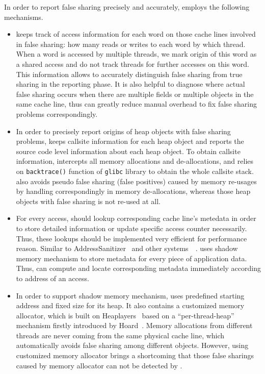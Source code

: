 In order to report false sharing precisely and accurately,  
\Predator{} employs the following mechanisms. 
\begin{itemize}
\item
\Predator{} keeps track of access information for each word on those
cache lines involved in false sharing: 
how many reads or writes to each word by which thread. 
When a word is accessed by multiple threads,
we mark origin of this word as a shared access and do not track threads for further accesses 
on this word. This information 
allows \Predator{} to accurately distinguish false sharing from true sharing 
in the reporting phase.
It is also helpful to diagnose where 
actual false sharing occurs when there are multiple fields or multiple objects 
in the same cache line, thus can greatly reduce manual overhead to fix false sharing problems
correspondingly. 

\item
In order to precisely report origins of heap objects with false sharing problems, \Predator{}
keeps callsite information for each heap object and reports the source code level
information about each heap object. To obtain callsite information, \Predator{}
intercepts all memory allocations and de-allocations, and relies on \texttt{backtrace()} 
function of \texttt{glibc} library to obtain the whole callsite stack. 
\Predator{} also avoids pseudo false sharing (false positives) caused by memory re-usages 
by handling correspondingly in memory de-allocations, whereas those heap objects with false 
sharing is not re-used at all.

\item
For every access, \Predator{} should lookup corresponding cache line's metedata 
in order to store detailed information or update specific access counter necessarily.
Thus, these lookups should be implemented very efficient for performance reason. 
Similar to 
AddressSanitizer~\cite{Addresssanitizer} and other systems~\cite{qinzhaodetection}~\cite{Valgrind}. 
\Predator{} uses shadow memory mechanism to store metadata for every piece of application data. 
Thus, \Predator{} can compute and locate corresponding metadata immediately according to address of
an access.

\item
In order to support shadow memory mechanism, \Predator{} uses predefined starting address and 
fixed size for its heap. 
It also contains a customized memory allocator, which is built on 
Heaplayers~\cite{heaplayers} based on a ``per-thread-heap'' mechanism firstly introduced 
by Hoard~\cite{Hoard}. 
Memory allocations from different threads are never coming 
from the same physical cache line, which automatically avoids false sharing among different objects. 
However, using customized memory allocator 
brings a shortcoming that those false sharings caused by memory 
allocator can not be detected by \Predator{}. 

\end{itemize} 
 
